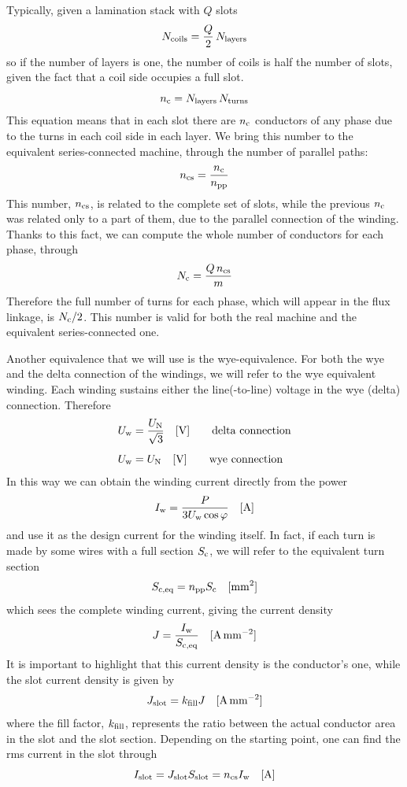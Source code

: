 \documentclass[a4paper,11pt,oneside,fleqn,titlepage]{report}
\newcommand{\Ncoils}{N_{\textup{coils}}}
\newcommand{\Nturns}{N_{\textup{turns}}}
\newcommand{\Nlayers}{N_{\textup{layers}}}
\newcommand{\npp}{n_{\textup{pp}}}
\newcommand{\nc}{n_{\textup{c}}}
\newcommand{\ncs}{n_{\textup{cs}}}
\newcommand{\Nc}{N_{\textup{c}}}
\newcommand{\Sc}{S_{\textup{c}}}
\newcommand{\Sceq}{S_{\textup{c,eq}}}
\newcommand{\Uw}{U_{\textup{w}}}
\newcommand{\Iw}{I_{\textup{w}}}
\newcommand{\kfill}{k_{\textup{fill}}}
\newcommand{\Jslot}{J_{\textup{slot}}}
\newcommand{\Islot}[1][]{I_{\textup{slot}#1}}
\newcommand{\Sslot}{S_{\textup{slot}}}
\begin{document}
Typically, given a lamination stack with $ Q $ slots
\begin{equation*}
\Ncoils = \frac{Q}{2}\,\Nlayers
\end{equation*}
so if the number of layers is one, the number of coils is 
half the number of slots, given the fact that a coil side 
occupies a full slot.
\begin{equation*}
\nc = \Nlayers\,\Nturns
\end{equation*}
This equation means that in each slot there are $ \nc $ conductors of 
any phase due to the turns in each coil side in each layer.
We bring this number to the equivalent series-connected machine, through the 
number of parallel paths:
\begin{equation*}
\ncs = \frac{\nc}{\npp}
\end{equation*}
This number, $ \ncs $, is related to the complete set of slots, while the 
previous $ \nc $ was related only to a part of them, due to the parallel 
connection of the winding. Thanks to this fact, we can compute the whole number 
of conductors for each phase, through
\begin{equation*}
\Nc = \frac{Q\,\ncs}{m}
\end{equation*}
Therefore the full number of turns for each phase, which will appear in the 
flux linkage, is $ \Nc/2 $. This number is valid for both the real machine and 
the equivalent series-connected one.

Another equivalence that we will use is the wye-equivalence. For both the wye 
and the delta connection of the windings, we will refer to the wye equivalent 
winding. Each winding sustains either the line(-to-line) voltage in the wye 
(delta) connection. 
Therefore
\begin{align*}
\Uw &= \frac{U_{\textup{N}}}{\sqrt{3}} \quad[\si{\volt}]	\qquad \text{delta 
connection} \\[1ex]
\Uw &= U_{\textup{N}} \quad[\si{\volt}]	\qquad \text{wye connection}
\end{align*}
In this way we can obtain the winding current directly from the power
\[
\Iw = \frac{P}{3 \Uw\cos\varphi} \quad[\si{\ampere}]
\]
and use it as the design current for the winding itself. In fact, if each turn 
is made by some wires with a full section $ \Sc $, we will refer to the 
equivalent turn section
\[
\Sceq = \npp \Sc \quad [\si{\milli\meter\squared}]
\]
which sees the complete winding current, giving the current density
\[
J = \frac{\Iw}{\Sceq} \quad [\si{\ampere\per\milli\meter\squared}]
\]
It is important to highlight that this current density is the conductor's one, 
while the slot current density is given by
\[
\Jslot = \kfill J \quad [\si{\ampere\per\milli\meter\squared}]
\]
where the fill factor, $ \kfill $, represents the ratio between the actual 
conductor area in the slot and the slot section.
Depending on the starting point, one can find the rms current in the slot 
through
\[
\Islot = \Jslot \Sslot = \ncs \Iw \quad[\si{\ampere}]
\]
\end{document}
